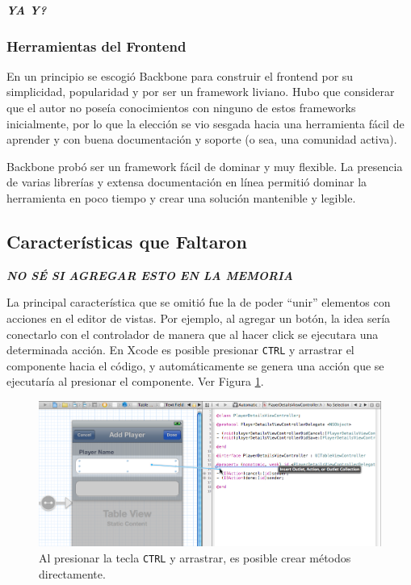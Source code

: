 \documentclass[12pt,titlepage,]{article}
\makeatletter
\def\maxwidth{\ifdim\Gin@nat@width>\linewidth\linewidth
\else\Gin@nat@width\fi}
\let\Oldincludegraphics\includegraphics
\renewcommand{\includegraphics}[1]{\Oldincludegraphics[width=\maxwidth]{#1}}
\makeatother
\begin{document}
\textbf{\emph{YA Y?}}

\subsubsection{Herramientas del Frontend}

En un principio se escogió Backbone para construir el frontend por su
simplicidad, popularidad y por ser un framework liviano. Hubo que
considerar que el autor no poseía conocimientos con ninguno de estos
frameworks inicialmente, por lo que la elección se vio sesgada hacia una
herramienta fácil de aprender y con buena documentación y soporte (o
sea, una comunidad activa).

Backbone probó ser un framework fácil de dominar y muy flexible. La
presencia de varias librerías y extensa documentación en línea permitió
dominar la herramienta en poco tiempo y crear una solución mantenible y
legible.

\subsection{Características que Faltaron}

\textbf{\emph{NO SÉ SI AGREGAR ESTO EN LA MEMORIA}}

La principal característica que se omitió fue la de poder ``unir''
elementos con acciones en el editor de vistas. Por ejemplo, al agregar
un botón, la idea sería conectarlo con el controlador de manera que al
hacer click se ejecutara una determinada acción. En Xcode es posible
presionar \texttt{CTRL} y arrastrar el componente hacia el código, y
automáticamente se genera una acción que se ejecutaría al presionar el
componente. Ver Figura \ref{figure:xcode-ctrl-drag}.

\begin{figure}[htbp]
\centering
\includegraphics{figures/xcode-ctrl-drag.png}
\caption{Al presionar la tecla \texttt{CTRL} y arrastrar, es posible
crear métodos directamente. \label{figure:xcode-ctrl-drag}}
\end{figure}
\end{document}
